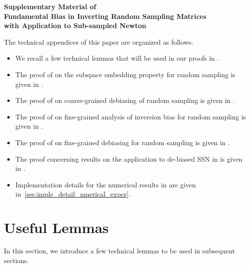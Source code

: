 \documentclass[11pt,a4paper]{article}
\begin{document}




\newpage
\appendix

\begin{center}
  \textbf{\large Supplementary Material of} \\ 
  \textbf{Fundamental Bias in Inverting Random Sampling Matrices\\ with Application to Sub-sampled Newton}
\end{center}


The technical appendices of this paper are organized as follows.
\begin{itemize}
    \item We recall a few technical lemmas that will be used in our proofs in .
    \item The proof of  on the subspace embedding property for random sampling is given in .
    \item The proof of  on coarse-grained debiasing of random sampling is given in .
    \item The proof of  on fine-grained analysis of inversion bias for random sampling is given in .
    \item The proof of  on fine-grained debiasing for random sampling is given in .
    \item The proof concerning results on the application to de-biased SSN in  is given in . 
    \item Implementation details for the numerical results in  are given in~\cref{sec:imple_detail_nmerical_exper}.
\end{itemize}


\section{Useful Lemmas}
\label{sec:lemmas}

In this section, we introduce a few technical lemmas to be used in subsequent sections.
\end{document}
